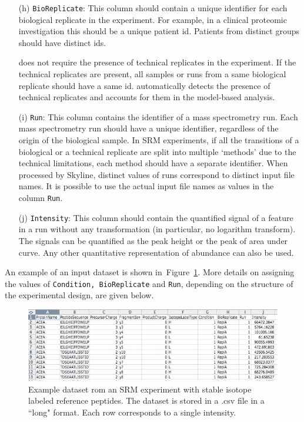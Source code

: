 \documentclass[11pt]{article}
\def\figref#1{Figure~\ref{fig:#1}}
\begin{document}
\begin{enumerate}
\item[(h)] {\tt BioReplicate}: This column should contain a unique identifier for each biological replicate in the experiment. For example, in a clinical proteomic investigation this should be a unique patient id. Patients from distinct groups should have distinct ids.

\m does not require the presence of technical replicates in the experiment. If the technical replicates are present, all samples or runs from a same biological replicate should have a same id. \m automatically detects the presence of technical replicates and accounts for them in the model-based analysis.  

\item[(i)] {\tt Run}: This column contains the identifier of a mass spectrometry run. Each mass spectrometry run should have a unique identifier, regardless of the origin of the biological sample. In SRM experiments, if all the transitions of a  biological or a technical replicate are split into multiple `methods' due to the technical limitations, each method should have a separate identifier. When processed by Skyline, distinct values of runs correspond to distinct input file names. It is possible to use the actual input file names as values in the column {\tt Run}.


\item[(j)] {\tt Intensity}: This column should contain the quantified signal of a feature in a run without any transformation (in particular, no logarithm transform). The signals can be quantified as the peak height or the peak of area under curve. Any other quantitative representation of abundance can also be used.

\end{enumerate}



An example of an input dataset is shown in~\figref{inputSRM}. More details on assigning the values of {\tt Condition, BioReplicate} and {\tt Run}, depending on the structure of the experimental design, are given below.

\begin{figure}[!h]
\centering
\includegraphics[totalheight=1.5in, width=5.5in]{requiredInput.jpg}
\vspace{-0.3cm}
\caption{\small Example dataset rom an SRM experiment with stable isotope labeled reference peptides. The dataset is stored in a .csv file in a ``long" format.  Each row corresponds to a single intensity.   
\label{fig:inputSRM}}
\end{figure}
\end{document}
